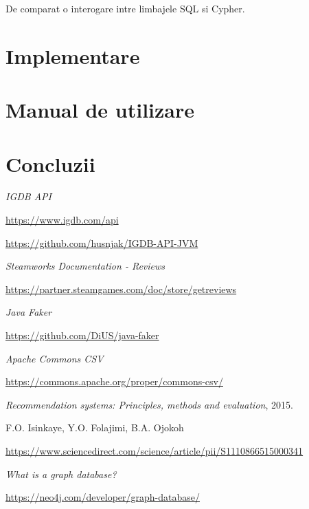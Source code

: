 \documentclass[12pt,a4paper]{report}
\begin{document}
De comparat o interogare intre limbajele SQL si Cypher.






\section{Implementare}
\section{Manual de utilizare}
\section{Concluzii}

\renewcommand\bibname{Bibliografie}
\begin{thebibliography}{9}

  
  \textit{IGDB API}
  
  \url{https://www.igdb.com/api}
  
  \url{https://github.com/husnjak/IGDB-API-JVM}
  
  
  \textit{Steamworks Documentation - Reviews}
  
  \url{https://partner.steamgames.com/doc/store/getreviews}
  
  
  \textit{Java Faker}
  
  \url{https://github.com/DiUS/java-faker}
  
  
  \textit{Apache Commons CSV}
  
  \url{https://commons.apache.org/proper/commons-csv/}


  
  \textit{Recommendation systems: Principles, methods and evaluation},
  2015.
  
  F.O. Isinkaye, Y.O. Folajimi, B.A. Ojokoh
  
  \url{https://www.sciencedirect.com/science/article/pii/S1110866515000341}
  
  
  \textit{What is a graph database?}
  
  \url{https://neo4j.com/developer/graph-database/}

\end{thebibliography}
\end{document}

